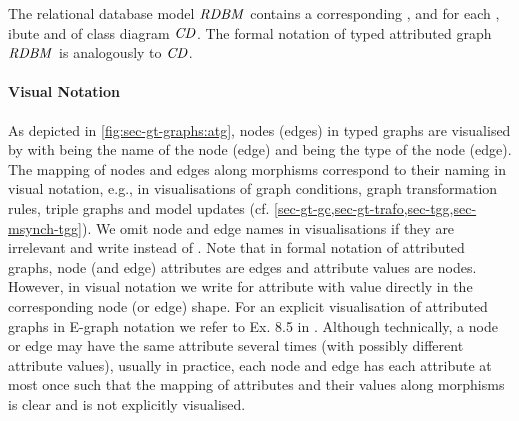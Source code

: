\begin{example}
The relational database model $\mathit{RDBM}$ contains a corresponding ,  and  for each , ibute and  of class diagram $\mathit{CD}$.
The formal notation of typed attributed graph $\mathit{RDBM}$ is analogously to $\mathit{CD}$.
\envEndMarker
\end{example}

\paragraph*{Visual Notation}
\label{par:sec-gt-graphs:vis}
As depicted in \cref{fig:sec-gt-graphs:atg}, nodes (edges) in typed graphs are visualised by  with  being the name of the node (edge) and  being the type of the node (edge).
The mapping of nodes and edges along morphisms correspond to their naming in visual notation, e.g., in visualisations of graph conditions, graph transformation rules, triple graphs and model updates (cf. \cref{sec-gt-gc,sec-gt-trafo,sec-tgg,sec-msynch-tgg}).
We omit node and edge names in visualisations if they are irrelevant and write  instead of .
Note that in formal notation of attributed graphs, node (and edge) attributes are edges and attribute values are nodes.
However, in visual notation we write  for attribute  with value  directly in the corresponding node (or edge) shape.
For an explicit visualisation of attributed graphs in E-graph notation we refer to Ex. 8.5 in \cite{Ehrig:2006:FAG:1121741}.
Although technically, a node or edge may have the same attribute several times (with possibly different attribute values), usually in practice, each node and edge has each attribute at most once such that the mapping of attributes and their values along morphisms is clear and is not explicitly visualised.